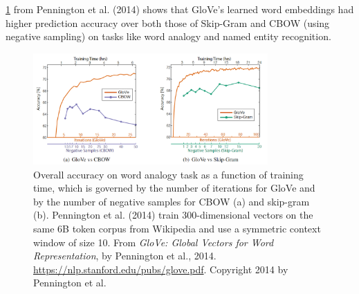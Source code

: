 \cref{fig:GloveVsWord2vec} from Pennington et al. (2014) shows that GloVe's learned word embeddings had higher prediction accuracy over both those of Skip-Gram and CBOW (using negative sampling) on tasks like word analogy and named entity recognition. 

\begin{figure}[h]
\vspace{-5pt}
\centering
\includegraphics[width=0.8\textwidth]{imgs/table_gloveVSword2vec.png}
\vspace{-5pt}
\caption{\footnotesize Overall accuracy on word analogy task as a function of training time, which is governed by the number of iterations for GloVe and by the number of negative samples for CBOW (a) and skip-gram (b). Pennington et al. (2014) train 300-dimensional vectors on the same 6B token corpus from Wikipedia and use a symmetric context window of size 10. From \emph{GloVe: Global Vectors for Word Representation}, by Pennington et al., 2014. \url{https://nlp.stanford.edu/pubs/glove.pdf}. Copyright 2014 by Pennington et al.}
\vspace{-5pt}
\label{fig:GloveVsWord2vec}
\end{figure}